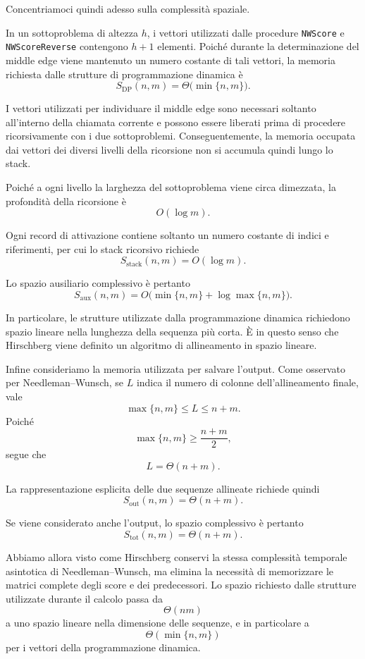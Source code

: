 Concentriamoci quindi adesso sulla complessità spaziale.

In un sottoproblema di altezza $h$, i vettori utilizzati dalle procedure \texttt{NWScore} e \texttt{NWScoreReverse} contengono $h+1$ elementi.
Poiché durante la determinazione del middle edge viene mantenuto un numero costante di tali vettori, la memoria richiesta dalle strutture di programmazione dinamica è
\[
    S_{\mathrm{DP}}(n,m) = \Theta\bigl(\min \{ n,m \}\bigr).
\]

I vettori utilizzati per individuare il middle edge sono necessari soltanto all'interno della chiamata corrente
e possono essere liberati prima di procedere ricorsivamente con i due sottoproblemi.
Conseguentemente, la memoria occupata dai vettori dei diversi livelli della ricorsione non si accumula quindi lungo lo stack.

Poiché a ogni livello la larghezza del sottoproblema viene circa dimezzata,
la profondità della ricorsione è 
\[
    O( \log m).
\]

Ogni record di attivazione contiene soltanto un numero costante di indici e riferimenti, per cui lo stack
ricorsivo richiede
\[
    S_{\mathrm{stack}}(n,m) = O( \log m).
\]

Lo spazio ausiliario complessivo è pertanto
\[
    S_{\mathrm{aux}}(n,m) = O\bigl( \min \{ n,m \}+ \log  \max \{ n,m \}\bigr).
\]

In particolare, le strutture utilizzate dalla programmazione dinamica richiedono spazio lineare nella lunghezza della sequenza
più corta. È in questo senso che Hirschberg viene definito un algoritmo di allineamento in spazio lineare.

Infine consideriamo la memoria utilizzata per salvare l'output.
Come osservato per Needleman--Wunsch, se $L$ indica il numero di colonne dell'allineamento finale, vale
\[
    \max \{ n,m \} \leq L \leq n+m.
\]
Poiché
\[
    \max \{ n,m \} \geq \frac{n+m}{2},
\]
segue che
\[
    L = \Theta(n+m).
\]

La rappresentazione esplicita delle due sequenze allineate richiede quindi
\[
    S_{\mathrm{out}}(n,m) = \Theta(n+m).
\]

Se viene considerato anche l'output, lo spazio complessivo è pertanto
\[
    S_{\mathrm{tot}}(n,m) = \Theta(n+m).
\]

Abbiamo allora visto come Hirschberg conservi la stessa complessità temporale asintotica di Needleman--Wunsch,
ma elimina la necessità di memorizzare le matrici complete degli score e dei predecessori.
Lo spazio richiesto dalle strutture utilizzate durante il calcolo passa da
\[
    \Theta(nm)
\]
a uno spazio lineare nella dimensione delle sequenze, e in particolare a
\[
    \Theta( \min \{ n,m \})
\]
per i vettori della programmazione dinamica.

